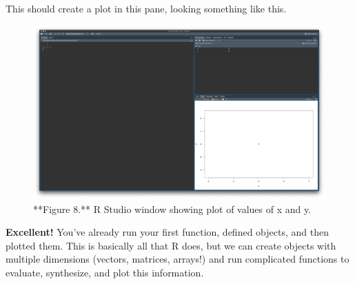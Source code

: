 \documentclass[
]{article}
\begin{document}
\hfill\break
\hfill\break

This should create a plot in this pane, looking something like this.

\begin{figure}

{\centering \includegraphics{images/Rst_plt} 

}

\caption{**Figure 8.** R Studio window showing plot of values of x and y.}\label{fig:plotting results screenshot}
\end{figure}

\hfill\break
\hfill\break

\textbf{Excellent!} You've already run your first function, defined
objects, and then plotted them. This is basically all that R does, but
we can create objects with multiple dimensions (vectors, matrices,
arrays!) and run complicated functions to evaluate, synthesize, and plot
this information.
\end{document}
